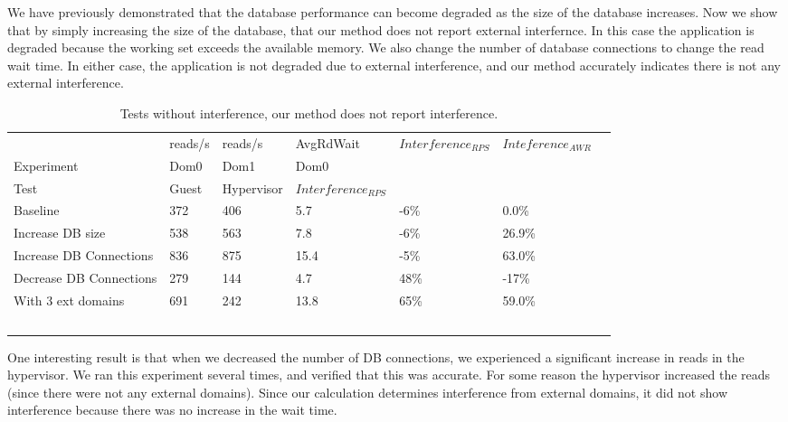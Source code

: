 We have previously demonstrated that the database performance can become degraded as the size of the database increases.  Now we show that by simply increasing the size of the database, that our method does not report external interfernce.  In this case the application is degraded because the working set exceeds the available memory.  We also change the number of database connections to change the read wait time.  In either case, the application is not degraded due to external interference, and our method accurately indicates there is not any external interference.

\begin{table}[h]
\begingroup
    \fontsize{10pt}{12pt}\selectfont
\begin{tabular}{ l l l l l l p{9cm} }
                   & reads/s & reads/s & AvgRdWait & $Interference_{RPS}$ & $Inteference_{AWR}$ \\
	Experiment     & Dom0     & Dom1     & Dom0      &                &             \\

    Test & Guest & Hypervisor  & $Interference_{RPS}$ \\
    \hline
    Baseline                   & 372 & 406 & 5.7 & -6\% & 0.0\%   \\  %
    Increase DB size           & 538 & 563 & 7.8 & -6\% & 26.9\% \\  %
    Increase DB Connections    & 836 & 875 &15.4 & -5\% & 63.0\% \\  %
	Decrease DB Connections    & 279 & 144 & 4.7 & 48\% & -17\%  \\  %
    With 3 ext domains         & 691 & 242 &13.8 & 65\% & 59.0\% \\  %
    \hline
  \end{tabular}
\caption{Tests without interference, our method does not report interference. }
\label{tab:HypervisorGuest}
\endgroup
\end{table}

One interesting result is that when we decreased the number of DB connections, we experienced a significant increase in reads in the hypervisor.  We ran this experiment several times, and verified that this was accurate.  For some reason the hypervisor increased the reads (since there were not any external domains).  Since our calculation determines interference from external domains, it did not show interference because there was no increase in the wait time.

